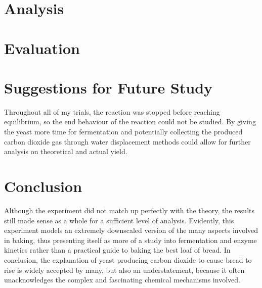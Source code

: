 \documentclass{article}
\begin{document}
\section{Analysis}

\section{Evaluation}

\section{Suggestions for Future Study}
Throughout all of my trials, the reaction was stopped before reaching equilibrium, so the end behaviour of the reaction could not be studied. By giving the yeast more time for fermentation and potentially collecting the produced carbon dioxide gas through water displacement methods could allow for further analysis on theoretical and actual yield.

\section{Conclusion}
Although the experiment did not match up perfectly with the theory, the results still made sense as a whole for a sufficient level of analysis. Evidently, this experiment models an extremely downscaled version of the many aspects involved in baking, thus presenting itself as more of a study into fermentation and enzyme kinetics rather than a practical guide to baking the best loaf of bread. In conclusion, the explanation of yeast producing carbon dioxide to cause bread to rise is widely accepted by many, but also an understatement, because it often unacknowledges the complex and fascinating chemical mechanisms involved.

\nocite{*}

\newpage

\printbibliography

\newpage

\captionsetup[table]{name=Appendix}
\setcounter{table}{0}
\end{document}
